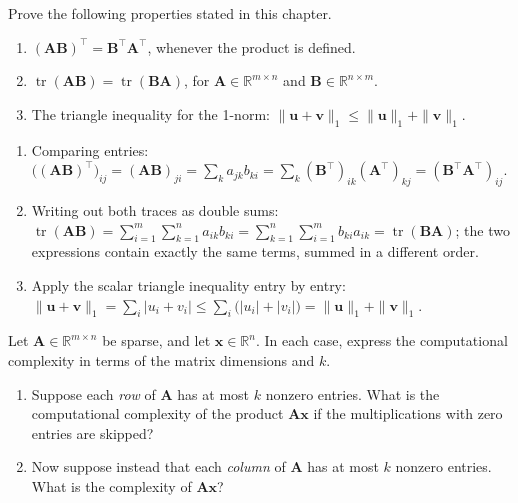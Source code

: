 \begin{exercise} %
    Prove the following properties stated in this chapter.
    \begin{enumerate}[label=(\alph*)]
        \item $(\mathbf{A}\mathbf{B})^\top = \mathbf{B}^\top\mathbf{A}^\top$, whenever the product is defined.
        \item $\operatorname{tr}(\mathbf{A}\mathbf{B}) = \operatorname{tr}(\mathbf{B}\mathbf{A})$, for $\mathbf{A} \in \mathbb{R}^{m \times n}$ and $\mathbf{B} \in \mathbb{R}^{n \times m}$.
        \item The triangle inequality for the 1-norm: $\|\mathbf{u} + \mathbf{v}\|_1 \leq \|\mathbf{u}\|_1 + \|\mathbf{v}\|_1$.
    \end{enumerate}
\end{exercise}

\begin{solution}
    \begin{enumerate}[label=(\alph*)]
        \item Comparing entries: $\bigl((\mathbf{A}\mathbf{B})^\top\bigr)_{ij} = (\mathbf{A}\mathbf{B})_{ji} = \sum_k a_{jk} b_{ki} = \sum_k (\mathbf{B}^\top)_{ik} (\mathbf{A}^\top)_{kj} = (\mathbf{B}^\top\mathbf{A}^\top)_{ij}$.
        \item Writing out both traces as double sums: $\operatorname{tr}(\mathbf{A}\mathbf{B}) = \sum_{i=1}^m \sum_{k=1}^n a_{ik} b_{ki} = \sum_{k=1}^n \sum_{i=1}^m b_{ki} a_{ik} = \operatorname{tr}(\mathbf{B}\mathbf{A})$; the two expressions contain exactly the same terms, summed in a different order.
        \item Apply the scalar triangle inequality entry by entry: $\|\mathbf{u} + \mathbf{v}\|_1 = \sum_i |u_i + v_i| \leq \sum_i \bigl(|u_i| + |v_i|\bigr) = \|\mathbf{u}\|_1 + \|\mathbf{v}\|_1$.
    \end{enumerate}
\end{solution}

\begin{exercise} %
    Let $\mathbf{A} \in \mathbb{R}^{m \times n}$ be sparse, and let $\mathbf{x} \in \mathbb{R}^n$. In each case, express the computational complexity in terms of the matrix dimensions and $k$.
    \begin{enumerate}[label=(\alph*)]
        \item Suppose each \emph{row} of $\mathbf{A}$ has at most $k$ nonzero entries. What is the computational complexity of the product $\mathbf{A}\mathbf{x}$ if the multiplications with zero entries are skipped?
        \item Now suppose instead that each \emph{column} of $\mathbf{A}$ has at most $k$ nonzero entries. What is the complexity of $\mathbf{A}\mathbf{x}$?
    \end{enumerate}
\end{exercise}


